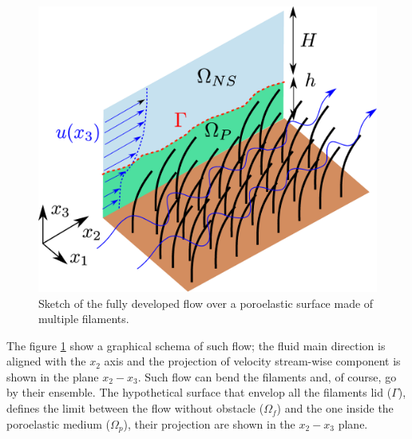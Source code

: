 \begin{figure}[h]
	\centering
	\includegraphics[width=0.7\linewidth]{chapter_1/problem_schema}
	\caption{Sketch of the fully developed flow over a poroelastic surface made of multiple filaments.}
	\label{fig:schema_problem}
\end{figure}

The figure \ref{fig:schema_problem} show a graphical schema of such flow; the fluid main direction is aligned with the $x_2$ axis and the projection of velocity stream-wise component is shown in the plane $x_2 - x_3$.
Such flow can bend the filaments and, of course, go by their ensemble.
The hypothetical surface that envelop all the filaments lid ($\Gamma$), defines the limit between the flow without obstacle ($\Omega_{f}$) and the one inside the poroelastic medium ($\Omega_{p}$), their projection are shown in the  $x_2 - x_3$ plane.

